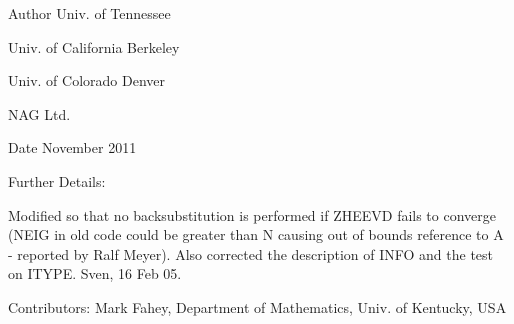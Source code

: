 \begin{DoxyAuthor}{Author}
Univ. of Tennessee 

Univ. of California Berkeley 

Univ. of Colorado Denver 

N\+A\+G Ltd. 
\end{DoxyAuthor}
\begin{DoxyDate}{Date}
November 2011 
\end{DoxyDate}
\begin{DoxyParagraph}{Further Details\+: }
\begin{DoxyVerb}  Modified so that no backsubstitution is performed if ZHEEVD fails to
  converge (NEIG in old code could be greater than N causing out of
  bounds reference to A - reported by Ralf Meyer).  Also corrected the
  description of INFO and the test on ITYPE. Sven, 16 Feb 05.\end{DoxyVerb}
 
\end{DoxyParagraph}
\begin{DoxyParagraph}{Contributors\+: }
Mark Fahey, Department of Mathematics, Univ. of Kentucky, U\+S\+A 
\end{DoxyParagraph}
